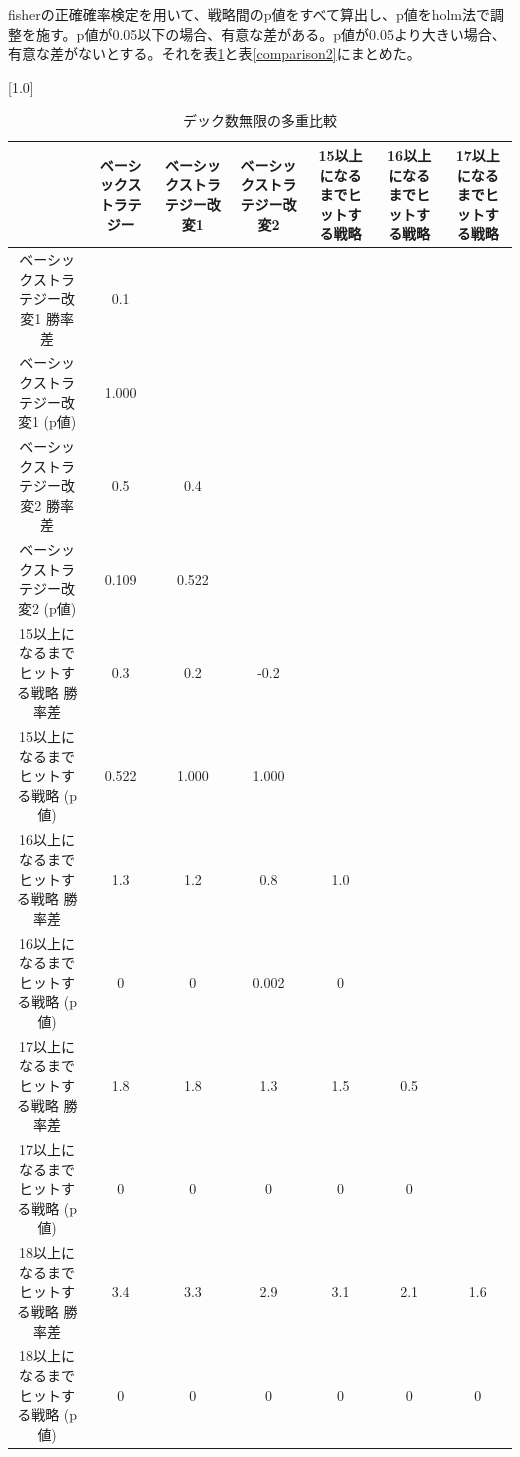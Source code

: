 fisherの正確確率検定を用いて、戦略間のp値をすべて算出し、p値をholm法で調整を施す。p値が0.05以下の場合、有意な差がある。p値が0.05より大きい場合、有意な差がないとする。それを表\ref{comparison1}と表\ref{comparison2}にまとめた。
\begin{table}[H]
 \caption{デック数無限の多重比較\label{comparison1}}
 \begin{center}
 \small
 \scalebox{0.5}[1.0]{
  \begin{tabular}{|c|c|c|c|c|c|c|}
    \hline & ベーシックストラテジー & ベーシックストラテジー改変1 & ベーシックストラテジー改変2 & 15以上になるまでヒットする戦略 & 16以上になるまでヒットする戦略 & 17以上になるまでヒットする戦略 \\
    \hline ベーシックストラテジー改変1 勝率差 & 0.1 &  &  &  &  &   \\
    ベーシックストラテジー改変1 (p値) & 1.000 &  &  &  &  &    \\
    \hline ベーシックストラテジー改変2 勝率差 & 0.5 & 0.4 & & & &  \\
    ベーシックストラテジー改変2 (p値) & 0.109 & 0.522 & & & &   \\
    \hline 15以上になるまでヒットする戦略 勝率差 & 0.3 & 0.2 & -0.2 & & &   \\
    15以上になるまでヒットする戦略 (p値) & 0.522 & 1.000 & 1.000 & & &  \\
    \hline 16以上になるまでヒットする戦略 勝率差 & 1.3 & 1.2 & 0.8 & 1.0 & &  \\
    16以上になるまでヒットする戦略 (p値) & 0 & 0 & 0.002 & 0 & &  \\
    \hline 17以上になるまでヒットする戦略 勝率差 & 1.8 & 1.8 & 1.3 & 1.5 & 0.5 &  \\
    17以上になるまでヒットする戦略 (p値) & 0 & 0 & 0 & 0 & 0 & \\
    \hline 18以上になるまでヒットする戦略 勝率差 & 3.4 & 3.3 & 2.9 & 3.1 & 2.1 & 1.6  \\
    18以上になるまでヒットする戦略 (p値) & 0 & 0 & 0 & 0 & 0 & 0  \\
    \hline
  \end{tabular}
 }
 \end{center}
\end{table}
